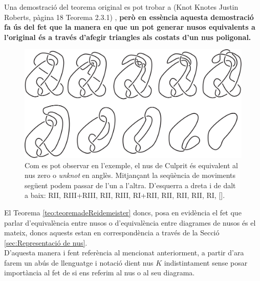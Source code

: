 Una demostració del teorema original es pot trobar a (Knot Knotes Justin Roberts, pàgina 18 Teorema 2.3.1) \cite{knotentheorie}, \textbf{però en essència aquesta demostració fa ús del fet que la manera en que un pot generar nusos equivalents a l'original és a través d'afegir triangles als costats d'un nus poligonal.}\\

\begin{figure}[H]
	\centering
	\includegraphics[width=0.9\linewidth]{img/culprit-knot.png}
	\caption{Com es pot observar en l'exemple, el nus de Culprit és equivalent al nus zero o \textit{unknot} en anglès. Mitjançant la seqüència de moviments següent podem passar de l'un a l'altra. D'esquerra a dreta i de dalt a baix: RII, RIII+RIII, RII, RIII, RI+RII, RII, RII, RII, RI, [\cite{culpritknot}].}\label{fig:culpritknot}
\end{figure}

El Teorema \ref{teo:teoremadeReidemeister} doncs, posa en evidència el fet que parlar d'equivalència entre nusos o d'equivalència entre diagrames de nusos és el mateix, doncs aquests estan en correspondència a través de la Secció \ref{sec:Representació de nus}.\\

D'aquesta manera i fent referència al mencionat anteriorment, a partir d'ara farem un abús de llenguatge i notació dient nus $K$ indistintament sense posar importància al fet de si ens referim al nus o al seu diagrama.